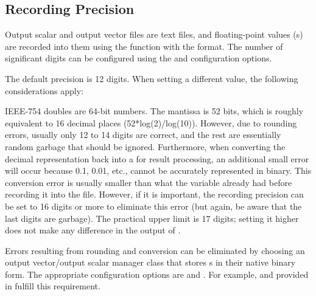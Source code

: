 \subsection{Recording Precision}
\label{sec:ana-sim:outputfile-precision}

Output scalar and output vector files are text files, and floating-point values
(s) are recorded into them using the  function with
the  format. The number of significant digits can be configured using
the  and 
configuration options.

The default precision is 12 digits. When setting a different value, the
following considerations apply:

IEEE-754 doubles are 64-bit numbers. The mantissa is 52 bits, which is roughly
equivalent to 16 decimal places (52*log(2)/log(10)). However, due to rounding
errors, usually only 12 to 14 digits are correct, and the rest are essentially
random garbage that should be ignored. Furthermore, when converting the decimal
representation back into a  for result processing, an additional
small error will occur because 0.1, 0.01, etc., cannot be accurately represented
in binary. This conversion error is usually smaller than what the 
variable already had before recording it into the file. However, if it is
important, the recording precision can be set to 16 digits or more to eliminate
this error (but again, be aware that the last digits are garbage). The practical
upper limit is 17 digits; setting it higher does not make any difference in the
output of .

%
%
%

Errors resulting from rounding and conversion can be eliminated by choosing an
output vector/output scalar manager class that stores s in their
native binary form. The appropriate configuration options are
 and . For
example,  and
 provided in  fulfill
this requirement.

